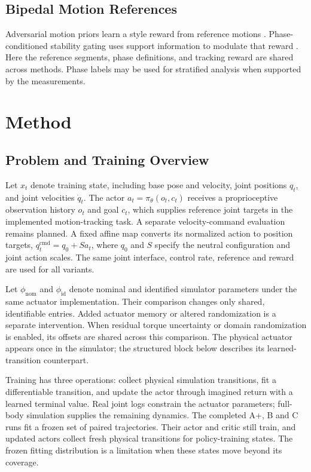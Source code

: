 \documentclass[letterpaper,10pt,conference]{ieeeconf}
\newcommand{\target}{q^{\mathrm{cmd}}}
\begin{document}
\subsection{Bipedal Motion References}
Adversarial motion priors learn a style reward from reference motions \cite{amp}. Phase-conditioned stability gating uses support information to modulate that reward \cite{sgamp}. Here the reference segments, phase definitions, and tracking reward are shared across methods. Phase labels may be used for stratified analysis when supported by the measurements.

\section{Method}
\subsection{Problem and Training Overview}\label{sec:overview}
Let $x_t$ denote training state, including base pose and velocity, joint positions $q_t$, and joint velocities $\dot q_t$. The actor $a_t=\pi_\theta(o_t,c_t)$ receives a proprioceptive observation history $o_t$ and goal $c_t$, which supplies reference joint targets in the implemented motion-tracking task. A separate velocity-command evaluation remains planned. A fixed affine map converts its normalized action to position targets, $\target_t=q_0+Sa_t$, where $q_0$ and $S$ specify the neutral configuration and joint action scales. The same joint interface, control rate, reference and reward are used for all variants.

Let $\phi_{\mathrm{nom}}$ and $\phi_{\mathrm{id}}$ denote nominal and identified simulator parameters under the same actuator implementation. Their comparison changes only shared, identifiable entries. Added actuator memory or altered randomization is a separate intervention. When residual torque uncertainty \cite{rti} or domain randomization is enabled, its offsets are shared across this comparison. The physical actuator appears once in the simulator; the structured block below describes its learned-transition counterpart.

Training has three operations: collect physical simulation transitions, fit a differentiable transition, and update the actor through imagined return with a learned terminal value. Real joint logs constrain the actuator parameters; full-body simulation supplies the remaining dynamics. The completed A+, B and C runs fit a frozen set of paired trajectories. Their actor and critic still train, and updated actors collect fresh physical transitions for policy-training states. The frozen fitting distribution is a limitation when these states move beyond its coverage.
\end{document}

